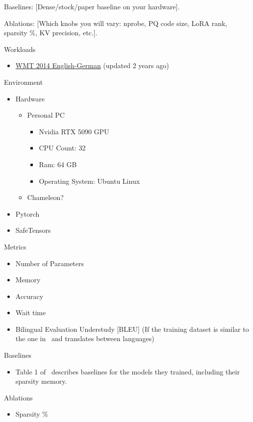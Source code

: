 \documentclass[
	title={Project Proposal}
]{cs595project}
\begin{document}
Baselines: [Dense/stock/paper baseline on your hardware].

Ablations: [Which knobs you will vary: nprobe, PQ code size, LoRA rank, sparsity \%, KV precision, etc.].
\fi

Workloads
\begin{itemize}
	\item \href{https://www.kaggle.com/datasets/mohamedlotfy50/wmt-2014-english-german}{WMT 2014 English-German} (updated 2 years ago)
\end{itemize}

Environment
\begin{itemize}
	\item Hardware
	\begin{itemize}
		\item Personal PC
		\begin{itemize}
			\item Nvidia RTX 5090 GPU
			\item CPU Count: 32
			\item Ram: 64 GB
			\item Operating System: Ubuntu Linux
		\end{itemize}
		\item Chameleon?
	\end{itemize}
	\item Pytorch
	\item SafeTensors
\end{itemize}

Metrics
\begin{itemize}
	\item Number of Parameters
	\item Memory
	\item Accuracy
	\item Wait time
	\item Bilingual Evaluation Understudy [BLEU]\supercite{LTH-Transformer} (If the training dataset is similar to the one in~\cite{LTH-Transformer} and translates between languages)
\end{itemize}

Baselines
\begin{itemize}
	\item Table 1 of~\cite{LTH-Transformer} describes baselines for the models they trained, including their sparsity memory.
\end{itemize}

Ablations
\begin{itemize}
	\item Sparsity \%
\end{itemize}
\end{document}
